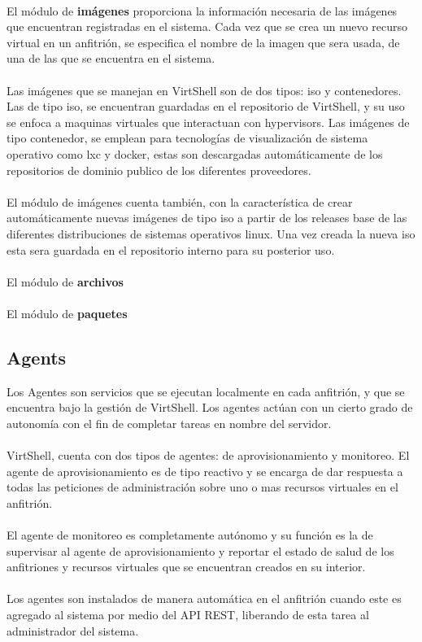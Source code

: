\\
El módulo de \textbf{imágenes} proporciona la información necesaria de las imágenes que encuentran registradas en el sistema. Cada vez que se crea un nuevo recurso virtual en un anfitrión, se especifica el nombre de la imagen que sera usada, de una de las que se encuentra en el sistema. \\
\\
Las imágenes que se manejan en VirtShell son de dos tipos: iso y contenedores. Las de tipo iso, se encuentran guardadas en el repositorio de VirtShell, y su uso se enfoca a maquinas virtuales que interactuan con hypervisors. Las imágenes de tipo contenedor, se emplean para tecnologías de visualización de sistema operativo como lxc y docker, estas son descargadas automáticamente de los repositorios de dominio publico de los diferentes proveedores. \\
\\
El módulo de imágenes cuenta también, con la característica de crear automáticamente nuevas imágenes de tipo iso a partir de los releases base de las diferentes distribuciones de sistemas operativos linux. Una vez creada la nueva iso esta sera guardada en el repositorio interno para su posterior uso.\\
\\
El módulo de \textbf{archivos}\\
\\

El módulo de \textbf{paquetes}

\subsection{Agents}
Los Agentes son servicios que se ejecutan localmente en cada anfitrión, y que se encuentra bajo la gestión de VirtShell. Los agentes actúan con un cierto grado de autonomía con el fin de completar tareas en nombre del servidor.\\
\\ 
VirtShell, cuenta con dos tipos de agentes: de aprovisionamiento y monitoreo. El agente de aprovisionamiento es de tipo reactivo y se encarga de dar respuesta a todas las peticiones de administración sobre uno o mas recursos virtuales en el anfitrión.\\
\\
El agente de monitoreo es completamente autónomo y su función es la de supervisar al agente de aprovisionamiento y reportar el estado de salud de los anfitriones y recursos virtuales que se encuentran creados en su interior.\\
\\
Los agentes son instalados de manera automática en el anfitrión cuando este es agregado al sistema por medio del API REST, liberando de esta tarea al administrador del sistema.

